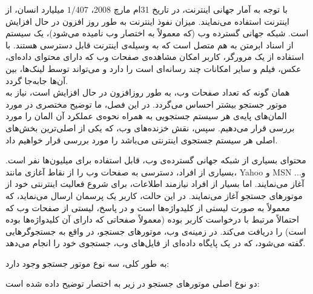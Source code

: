 
با توجه به آمار جهانی اینترنت، در تاریخ 31‌ام مارچ 2008، $1/407$ میلیارد انسان، از اینترنت استفاده می‌نمایند. میزان نفوذ اینترنت به طور روز افزون در حال افزایش است. شبکه جهانی گسترده وب (که معمولاً به اختصار وب نامیده می‌شود)، یک سیستم از اسناد ابرمتن به هم متصل است که به وسیله‌ی اینترنت قابل دسترسی هستند. با استفاده از یک مرورگر، کاربر امکان مشاهده‌ی صفحات وب که دارای محتوای داده‌ای، عکس، فیلم و سایر امکانات چند رسانه‌ای است را دارد و می‌تواند توسط لینک‌ها، بین آن‌ها جابه‌جا گردد.
\\
همان گونه که تعداد صفحات وب، به طور روزافزون در حال افزایش است، نیاز به موتور جستجو بیشتر احساس می‌گردد. در این فصل، ما توضیح مختصری در مورد المان‌های پایه‌ی هر سیستم جستجویی به همراه نحوه‌ی عملکرد آن المان را مورد بررسی قرار می‌دهیم. سپس، نقش خزنده‌های وب، که یکی از اصلی‌ترین بخش‌های اصلی هر سیستم جستجوی اینترنتی می‌باشد را مورد بررسی قرار خواهیم داد.

محتوای بسیاری از شبکه جهانی گسترده‌ی وب، قابل استفاده برای میلیون‌ها نفر است. بسیاری از افراد، دسترسی به صفحات وب را از نقاط آغازی مانند، Yahoo و MSN و... آغاز می‌نمایند. اما بسیار از افراد نیازمند اطلاعات، برای شروع فعالیت اینترنتی خود از موتورهای جستجو آغاز می‌نمایند. در این حالت، کاربر یک پرسمان ارسال می‌نماید، که معمولاً به صورت لیستی از کلیدواژه‌ها است و در پاسخ، لیستی از صفحات وب که احتمالاً مرتبط با درخواست کاربر بوده (معمولاً صفحاتی که دارای آن کلیدواژه‌ها بوده است) را دریافت می‌کند. در زمینه‌ی وب، موتورهای جستجو، در واقع به جستجوگرهایی گفته می‌شود، که در یک پایگاه داده‌ای از فایل‌های وب، جستجوی خود را انجام می‌دهد.

به طور کلی، سه نوع موتور جستجو وجود دارد:






دو نوع اصلی موتورهای جستجو در زیر به اختصار توضیح داده شده است:

